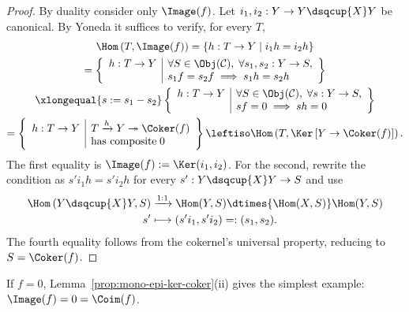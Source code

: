 \begin{proof}
	By duality consider only $\Image(f)$. Let $i_1,i_2:Y\to Y\dsqcup{X}Y$ be canonical. By Yoneda it suffices to verify, for every $T$,
	\begin{multline*}
		\Hom\left( T, \Image(f) \right) = \left\{ h: T \to Y \;\middle|\; i_1 h = i_2 h \right\} \\
		= \left\{ \begin{array}{r|l}
			h: T \to Y & \forall S \in \Obj(\mathcal{C}),\; \forall s_1, s_2: Y \to S, \\
			& s_1 f = s_2 f \implies s_1 h = s_2 h
		\end{array}\right\} \\
		\xlongequal{s := s_1 - s_2} \left\{ \begin{array}{r|l}
			h: T \to Y & \forall S \in \Obj(\mathcal{C}),\; \forall s: Y \to S, \\
			& s f = 0 \implies sh = 0
		\end{array}\right\} \\
		= \left\{ \begin{array}{r|l}
			h: T \to Y & T \xrightarrow{h} Y \twoheadrightarrow \Coker(f) \\
			& \text{has composite}\; 0
		\end{array}\right\}
		\leftiso \Hom\left( T, \Ker\left[ Y \to \Coker(f) \right] \right).
	\end{multline*}
	The first equality is $\Image(f):=\Ker(i_1,i_2)$. For the second, rewrite the condition as $s'i_1h=s'i_2h$ for every $s':Y\dsqcup{X}Y\to S$ and use
	\begin{align*}
		\Hom\left( Y \dsqcup{X} Y, S \right) & \xrightarrow{1:1} \Hom(Y,S) \dtimes{\Hom(X,S)} \Hom(Y,S) \\
		s' & \longmapsto \left( s' i_1, s' i_2 \right) =: (s_1, s_2).
	\end{align*}
	The fourth equality follows from the cokernel's universal property, reducing to $S=\Coker(f)$.
\end{proof}

If $f=0$, Lemma~\ref{prop:mono-epi-ker-coker}(ii) gives the simplest example: $\Image(f)=0=\Coim(f)$.


